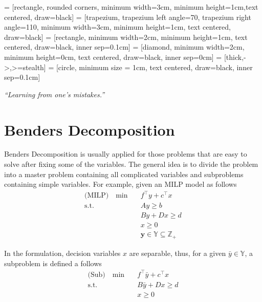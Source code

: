 
\usepackage{makecell}

\usetikzlibrary{shapes.geometric, arrows}
     = [rectangle, rounded corners, minimum width=3cm, minimum height=1cm,text centered, draw=black]
     = [trapezium, trapezium left angle=70, trapezium right angle=110, minimum width=3cm, minimum height=1cm, text centered, draw=black]
     = [rectangle, minimum width=2cm, minimum height=1cm, text centered, draw=black, inner sep=0.1cm]
     = [diamond, minimum width=2cm, minimum height=0cm, text centered, draw=black, inner sep=0cm]
     = [thick,->,>=stealth]
     = [circle, minimum size = 1cm, text centered, draw=black, inner sep=0.1cm]

\renewcommand{\docTitle}{Lecture 8 - Benders Decomposition}
\renewcommand{\docAuthor}{Lan Peng, Ph.D.}
\renewcommand{\docAffil}{School of Management, Shanghai University, Shanghai, China}

    \titleSec

    \begin{center}
        \textit{``Learning from one's mistakes.''}
    \end{center}
    \section{Benders Decomposition}
        Benders Decomposition is usually applied for those problems that are easy to solve after fixing some of the variables. The general idea is to divide the problem into a master problem containing all complicated variables and subproblems containing simple variables. For example, given an MILP model as follows
        \begin{align*}
            \text{(MILP)} \quad \min \quad & f^\top y + c^\top x \\
            \text{s.t.} \quad & A y \ge b \\
            & By + Dx \ge d\\
            & x \ge 0\\
            & \mathbf{y} \in \mathbb{Y} \subseteq \mathbb{Z}_+
        \end{align*}

        In the formulation, decision variables $x$ are separable, thus, for a given $\bar{y} \in \mathbb{Y}$, a subproblem is defined a follows
        \begin{align*}
            \text{(Sub)} \quad \min \quad & f^\top \bar{y} + c^\top x\\
            \text{s.t.} \quad & B \bar{y} + Dx \ge d\\
            & x \ge 0
        \end{align*}

